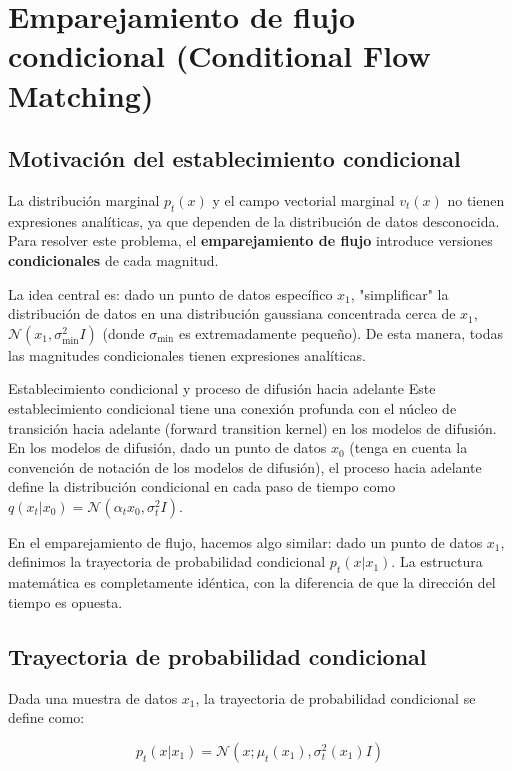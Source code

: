 \section{Emparejamiento de flujo condicional (Conditional Flow Matching)}

\subsection{Motivación del establecimiento condicional}

La distribución marginal $p_t(x)$ y el campo vectorial marginal $v_t(x)$ no tienen expresiones analíticas, ya que dependen de la distribución de datos desconocida. Para resolver este problema, el \textbf{emparejamiento de flujo} introduce versiones \textbf{condicionales} de cada magnitud.

La idea central es: dado un punto de datos específico $x_1$, "simplificar" la distribución de datos en una distribución gaussiana concentrada cerca de $x_1$, $\mathcal{N}(x_1, \sigma_{\min}^2 I)$ (donde $\sigma_{\min}$ es extremadamente pequeño). De esta manera, todas las magnitudes condicionales tienen expresiones analíticas.

\begin{knowledgebox}{Establecimiento condicional y proceso de difusión hacia adelante}
Este establecimiento condicional tiene una conexión profunda con el núcleo de transición hacia adelante (forward transition kernel) en los modelos de difusión. En los modelos de difusión, dado un punto de datos $x_0$ (tenga en cuenta la convención de notación de los modelos de difusión), el proceso hacia adelante define la distribución condicional en cada paso de tiempo como $q(x_t | x_0) = \mathcal{N}(\alpha_t x_0, \sigma_t^2 I)$.

En el emparejamiento de flujo, hacemos algo similar: dado un punto de datos $x_1$, definimos la trayectoria de probabilidad condicional $p_t(x | x_1)$. La estructura matemática es completamente idéntica, con la diferencia de que la dirección del tiempo es opuesta.
\end{knowledgebox}

\subsection{Trayectoria de probabilidad condicional}

Dada una muestra de datos $x_1$, la trayectoria de probabilidad condicional se define como:

$$p_t(x | x_1) = \mathcal{N}(x; \mu_t(x_1), \sigma_t^2(x_1) I)$$


